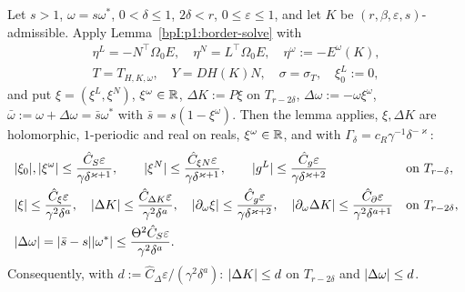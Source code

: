 \begin{lemma}\label{bpI:p2:correction}
Let $s>1$, $\omega=s\omega^*$, $0<\delta\le1$, $2\delta<r$, $0\le\varepsilon\le1$, and let $K$ be $(r,\beta,\varepsilon,s)$-admissible. Apply Lemma~\ref{bpI:p1:border-solve} with
\begin{gather*}
\eta^L=-N^\top\Omega_0E,\quad\eta^N=L^\top\Omega_0E,\quad\eta^\omega:=-E^\omega(K),\\
T=T_{H,K,\omega},\quad Y=DH(K)N,\quad\sigma=\sigma_T,\quad\xi^L_0:=0,
\end{gather*}
and put $\xi=(\xi^L,\xi^N)$, $\xi^\omega\in\mathbb{R}$, $\Delta K:=P\xi$ on $T_{r-2\delta}$, $\Delta\omega:=-\omega\xi^\omega$, $\bar\omega:=\omega+\Delta\omega=\bar s\omega^*$ with $\bar s=s(1-\xi^\omega)$. Then the lemma applies, $\xi,\Delta K$ are holomorphic, $1$-periodic and real on reals, $\xi^\omega\in\mathbb{R}$, and with
$\Gamma_\delta=c_R\gamma^{-1}\delta^{-\varkappa}$:
\begin{align*}
&\lvert \xi_0\rvert,\lvert \xi^\omega\rvert\le\frac{\hat C_S\varepsilon}{\gamma\delta^{\varkappa+1}},\qquad
\lvert \xi^N\rvert\le\frac{\hat C_{\xi N}\varepsilon}{\gamma\delta^{\varkappa+1}},\qquad
\lvert g^L\rvert\le\frac{\hat C_g\varepsilon}{\gamma\delta^{\varkappa+2}}&&\text{on }T_{r-\delta},\\
&\lvert \xi\rvert\le\frac{\hat C_\xi\varepsilon}{\gamma^2\delta^a},\quad\lvert \Delta K\rvert\le\frac{\hat C_{\Delta K}\varepsilon}{\gamma^2\delta^a},\quad\lvert \partial_\omega\xi\rvert\le\frac{\hat C_g\varepsilon}{\gamma\delta^{\varkappa+2}},\quad
\lvert \partial_\omega\Delta K\rvert\le\frac{\hat C_\partial\varepsilon}{\gamma^2\delta^{a+1}}&&\text{on }T_{r-2\delta},\\
&\lvert \Delta\omega\rvert=\lvert \bar s-s\rvert\lvert \omega^*\rvert\le\frac{\Theta^2\hat C_S\varepsilon}{\gamma^2\delta^a}.
\end{align*}
Consequently, with $d:=\hat C_\Delta\varepsilon/(\gamma^2\delta^a)$: $\lvert \Delta K\rvert\le d$ on $T_{r-2\delta}$ and $\lvert \Delta\omega\rvert\le d$.
\end{lemma}
